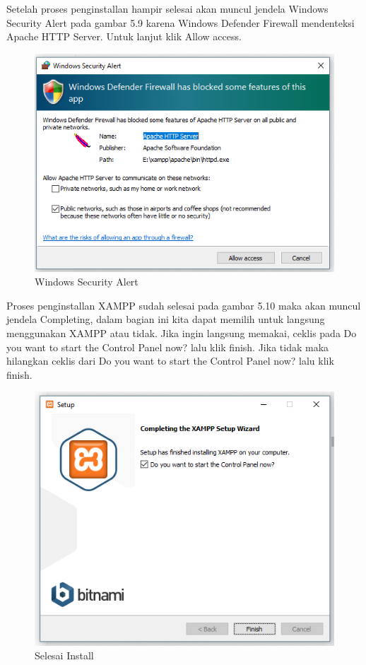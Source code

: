 Setelah proses penginstallan hampir selesai akan muncul jendela Windows Security Alert pada gambar 5.9 karena Windows Defender Firewall mendenteksi Apache HTTP Server. Untuk lanjut klik Allow access.

\begin{figure}[h]
\centering
\includegraphics[scale=0.5]{figures/windowssecurityalert}
\caption{Windows Security Alert}
\end{figure}

Proses penginstallan XAMPP sudah selesai pada gambar 5.10 maka akan muncul jendela Completing, dalam bagian ini kita dapat memilih untuk langsung menggunakan XAMPP atau tidak. Jika ingin langsung memakai, ceklis pada Do you want to start the Control Panel now? lalu klik finish. Jika tidak maka hilangkan ceklis dari  Do you want to start the Control Panel now? lalu klik finish.

\begin{figure}[h]
\centering
\includegraphics[scale=0.5]{figures/selesaiinstall}
\caption{Selesai Install}
\end{figure}


